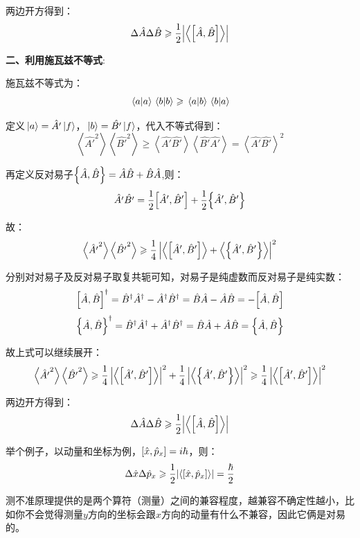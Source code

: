 两边开方得到：
\[\Delta \hat{A}\Delta \hat{B} \geqslant \frac{1}{2}\qty|\left \langle \comm{\hat{A}}{\hat{B}} \right \rangle|\]

\textbf{二、利用施瓦兹不等式}:

施瓦兹不等式为：
\[\bra*{a}\ket*{a}\bra*{b}\ket*{b} \geqslant \bra*{a}\ket*{b}\bra*{b}\ket*{a}\]

定义$\ket*{a}=\hat{A'}\ket*{f}$，$\ket*{b}=\hat{B'}\ket*{f}$，代入不等式得到：
\[\left \langle \hat{A'}^2 \right \rangle\left \langle \hat{B'}^2 \right \rangle \geqslant \left \langle \hat{A'}\hat{B'} \right \rangle\left \langle \hat{B'}\hat{A'} \right \rangle=\left \langle \hat{A'}\hat{B'} \right \rangle^2\]

再定义反对易子$\qty{\hat{A},\hat{B}}=\hat{A}\hat{B}+\hat{B}\hat{A}$,则：
\[\hat{A'}\hat{B'}=\frac{1}{2}\comm{\hat{A}'}{\hat{B}'}+\frac{1}{2}\qty{\hat{A}',\hat{B}'}\]

故：
\[\left \langle \hat{A'}^2 \right \rangle\left \langle \hat{B'}^2 \right \rangle \geqslant \frac{1}{4} \left | \left \langle \comm{\hat{A}'}{\hat{B}'} \right \rangle+\left \langle \qty{\hat{A}',\hat{B}'} \right \rangle \right |^2\]

分别对对易子及反对易子取复共轭可知，对易子是纯虚数而反对易子是纯实数：
\[\comm{\hat{A}}{\hat{B}}^{\dagger}=\hat{B}^{\dagger}\hat{A}^{\dagger}-\hat{A}^{\dagger}\hat{B}^{\dagger}=\hat{B}\hat{A}-\hat{A}\hat{B}=-\comm{\hat{A}}{\hat{B}}\]
\[\qty{\hat{A},\hat{B}}^{\dagger}=\hat{B}^{\dagger}\hat{A}^{\dagger}+\hat{A}^{\dagger}\hat{B}^{\dagger}=\hat{B}\hat{A}+\hat{A}\hat{B}=\qty{\hat{A},\hat{B}}\]

故上式可以继续展开：
\[\left \langle \hat{A'}^2 \right \rangle\left \langle \hat{B'}^2 \right \rangle \geqslant \frac{1}{4} \left | \left \langle \comm{\hat{A}'}{\hat{B}'} \right \rangle \right |^2 +\frac{1}{4} \left |\left \langle \qty{\hat{A}',\hat{B}'} \right \rangle \right |^2 \geqslant \frac{1}{4} \left | \left \langle \comm{\hat{A}'}{\hat{B}'} \right \rangle \right |^2\]

两边开方得到：
\[\Delta \hat{A}\Delta \hat{B} \geqslant \frac{1}{2}\qty|\left \langle \comm{\hat{A}}{\hat{B}} \right \rangle|\]

举个例子，以动量和坐标为例，$\comm{\hat{x}}{\hat{p}_x}=i\hbar$，则：
\[\Delta \hat{x}\Delta \hat{p}_x \geqslant \frac{1}{2}\qty|\left \langle \comm{\hat{x}}{\hat{p}_x} \right \rangle|=\frac{\hbar}{2}\]

测不准原理提供的是两个算符（测量）之间的兼容程度，越兼容不确定性越小，比如你不会觉得测量$y$方向的坐标会跟$x$方向的动量有什么不兼容，因此它俩是对易的。

